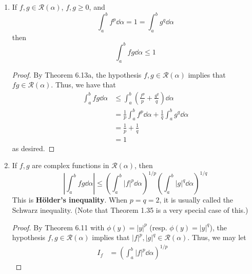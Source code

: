 \documentclass[../psets.tex]{subfiles}
\begin{document}
\begin{enumerate}[label={\textbf{\arabic*.}}]
\begin{enumerate}
\begin{proof}
            we know that $f(v)\geq 0$ on its domain, as desired.\par
            Additionally, since $f$ is strictly decreasing on $(0,u^{p/q})$ and strictly increasing on $(u^{p/q},\infty)$, we know that $f(v)=0$ iff $v=u^{p/q}$, i.e., iff $v^q=u^p$, as desired.
        \end{proof}
        \item If $f,g\in\mathscr{R}(\alpha)$, $f,g\geq 0$, and
        \begin{equation*}
            \int_a^bf^p\dd{\alpha} = 1 = \int_a^bg^q\dd{\alpha}
        \end{equation*}
        then
        \begin{equation*}
            \int_a^b fg\dd{\alpha} \leq 1
        \end{equation*}
        \begin{proof}
            By Theorem 6.13a, the hypothesis $f,g\in\mathscr{R}(\alpha)$ implies that $fg\in\mathscr{R}(\alpha)$. Thus, we have that
            \begin{align*}
                \int_a^bfg\dd{\alpha} &\leq \int_a^b\left( \frac{f^p}{p}+\frac{g^q}{q} \right)\dd{\alpha}\tag*{Theorem 6.12b}\\
                &= \frac{1}{p}\int_a^bf^p\dd{\alpha}+\frac{1}{q}\int_a^bg^q\dd{\alpha}\tag*{Theorem 6.12a}\\
                &= \frac{1}{p}+\frac{1}{q}\\
                &= 1
            \end{align*}
            as desired.
        \end{proof}
        \item If $f,g$ are complex functions in $\mathscr{R}(\alpha)$, then
        \begin{equation*}
            \left| \int_a^bfg\dd{\alpha} \right| \leq \left( \int_a^b|f|^p\dd{\alpha} \right)^{1/p}\left( \int_a^b|g|^q\dd{\alpha} \right)^{1/q}
        \end{equation*}
        This is \textbf{H\"{o}lder's inequality}. When $p=q=2$, it is usually called the Schwarz inequality. (Note that Theorem 1.35 is a very special case of this.)
        \begin{proof}
            By Theorem 6.11 with $\phi(y)=|y|^p$ (resp. $\phi(y)=|y|^q$), the hypothesis $f,g\in\mathscr{R}(\alpha)$ implies that $|f|^p,|g|^q\in\mathscr{R}(\alpha)$. Thus, we may let
            \begin{align*}
                I_f &= \left( \int_a^b|f|^p\dd{\alpha} \right)^{1/p}&

\end{align*}
\end{proof}
\end{enumerate}
\end{enumerate}
\end{document}
